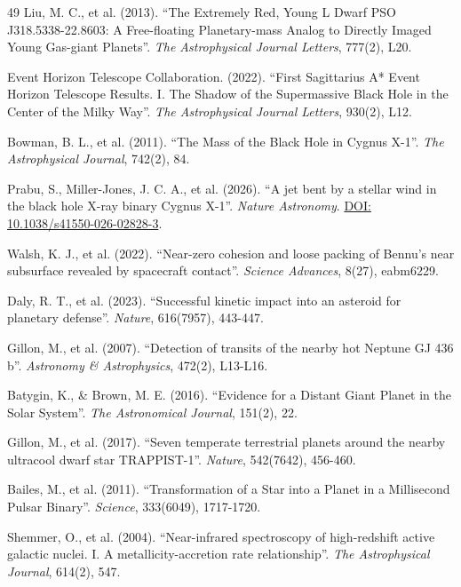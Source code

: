 \documentclass[11pt, a4paper]{article}
\newcommand{\doi}[1]{\href{https://doi.org/#1}{DOI: #1}}
\begin{document}
\begin{thebibliography}{49}
  Liu, M. C., et al. (2013). ``The Extremely Red, Young L Dwarf PSO J318.5338-22.8603: A Free-floating Planetary-mass Analog to Directly Imaged Young Gas-giant Planets''. \textit{The Astrophysical Journal Letters}, 777(2), L20.

  Event Horizon Telescope Collaboration. (2022). ``First Sagittarius A* Event Horizon Telescope Results. I. The Shadow of the Supermassive Black Hole in the Center of the Milky Way''. \textit{The Astrophysical Journal Letters}, 930(2), L12.

  Bowman, B. L., et al. (2011). ``The Mass of the Black Hole in Cygnus X-1''. \textit{The Astrophysical Journal}, 742(2), 84.

  Prabu, S., Miller-Jones, J. C. A., et al. (2026). ``A jet bent by a stellar wind in the black hole X-ray binary Cygnus X-1''. \textit{Nature Astronomy}.
  \doi{10.1038/s41550-026-02828-3}.

  Walsh, K. J., et al. (2022). ``Near-zero cohesion and loose packing of Bennu's near subsurface revealed by spacecraft contact''. \textit{Science Advances}, 8(27), eabm6229.

  Daly, R. T., et al. (2023). ``Successful kinetic impact into an asteroid for planetary defense''. \textit{Nature}, 616(7957), 443-447.

  Gillon, M., et al. (2007). ``Detection of transits of the nearby hot Neptune GJ 436 b''. \textit{Astronomy \& Astrophysics}, 472(2), L13-L16.

  Batygin, K., \& Brown, M. E. (2016). ``Evidence for a Distant Giant Planet in the Solar System''. \textit{The Astronomical Journal}, 151(2), 22.

  Gillon, M., et al. (2017). ``Seven temperate terrestrial planets around the nearby ultracool dwarf star TRAPPIST-1''. \textit{Nature}, 542(7642), 456-460.

  Bailes, M., et al. (2011). ``Transformation of a Star into a Planet in a Millisecond Pulsar Binary''. \textit{Science}, 333(6049), 1717-1720.

  Shemmer, O., et al. (2004). ``Near-infrared spectroscopy of high-redshift active galactic nuclei. I. A metallicity-accretion rate relationship''. \textit{The Astrophysical Journal}, 614(2), 547.


\end{thebibliography}
\end{document}
